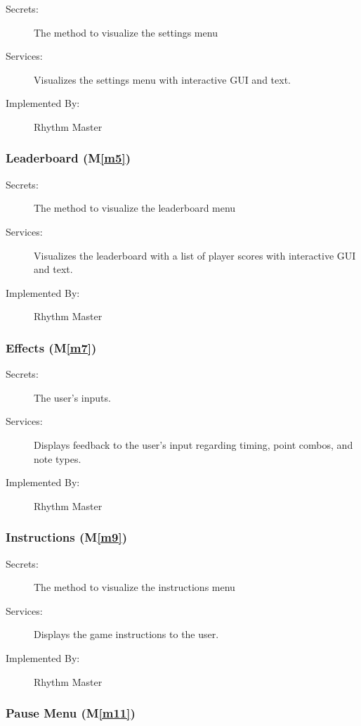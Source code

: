 \documentclass[12pt, titlepage]{article}
\newcommand{\mref}[1]{M\ref{#1}}
\begin{document}
\begin{description}
\item[Secrets:]The method to visualize the settings menu
\item[Services:]Visualizes the settings menu with interactive GUI and text.
\item[Implemented By:] Rhythm Master
\end{description}

\subsubsection{Leaderboard (\mref{m5})}

\begin{description}
\item[Secrets:]The method to visualize the leaderboard menu
\item[Services:]Visualizes the leaderboard with a list of player scores with interactive GUI and text.
\item[Implemented By:] Rhythm Master
\end{description}

\subsubsection{Effects (\mref{m7})}

\begin{description}
\item[Secrets:]The user's inputs.
\item[Services:]Displays feedback to the user's input regarding timing, point combos, and note types.
\item[Implemented By:] Rhythm Master
\end{description}

\subsubsection{Instructions (\mref{m9})}

\begin{description}
\item[Secrets:] The method to visualize the instructions menu
\item[Services:] Displays the game instructions to the user.
\item[Implemented By:] Rhythm Master
\end{description}

\subsubsection{Pause Menu (\mref{m11})}
\end{document}
